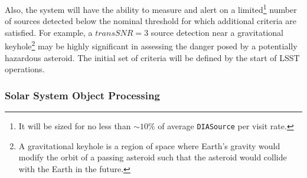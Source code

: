 \documentclass[12pt]{article}
\newcommand{\code}[1]{\texttt{#1}}
\newcommand{\DIASource}{\code{DIASource}\xspace}
\begin{document}
Also, the system will have the ability to measure and alert on a limited\footnote{It will be sized for no less than $\sim 10\%$ of average \DIASource per visit rate.} number of sources detected below the nominal threshold for which additional criteria are satisfied. For example, a $transSNR = 3$ source detection near a gravitational keyhole\footnote{
A gravitational keyhole is a region of space where Earth's gravity would modify the orbit of a passing asteroid
such that the asteroid would collide with the Earth in the future.}
may be highly significant in assessing the danger posed by a potentially hazardous asteroid.
The initial set of criteria will be defined by the start of LSST operations.

\subsubsection{Solar System Object Processing}
\label{sec:ssProcessing}
\end{document}
